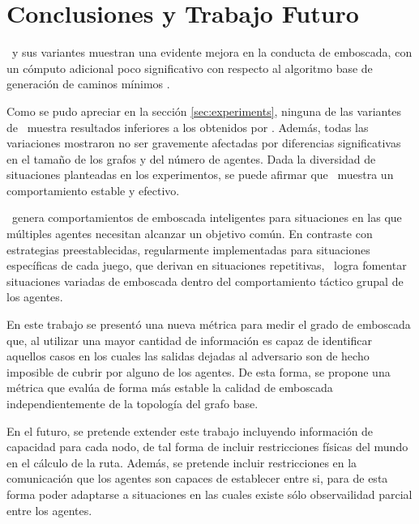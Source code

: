 \section{Conclusiones y Trabajo Futuro}
\label{sec:conclusions}

\ambush\ y sus variantes muestran una evidente mejora en la conducta de
emboscada, con un c\'omputo adicional poco significativo con respecto
al algoritmo base de generaci\'on de caminos m\'inimos \astar.

Como se pudo apreciar en la secci\'on \ref{sec:experiments}, ninguna
de las variantes de \ambush\ muestra resultados inferiores a los obtenidos
por \astar. Adem\'as, todas las variaciones mostraron no ser gravemente
afectadas por diferencias significativas en el tamaño de los grafos y
del n\'umero de agentes. Dada la diversidad de situaciones planteadas
en los experimentos, se puede afirmar que \ambush\ muestra un comportamiento
estable y efectivo.

\ambush\ genera comportamientos de emboscada inteligentes para situaciones
en las que múltiples agentes necesitan alcanzar un objetivo común. En
contraste con estrategias preestablecidas, regularmente implementadas para
situaciones específicas de cada juego, que derivan en situaciones repetitivas,
\ambush\ logra fomentar situaciones va\-ria\-das de emboscada dentro del 
comportamiento táctico grupal de los agentes.

En este trabajo se present\'o una nueva m\'etrica para medir el grado de
emboscada que, al utilizar una mayor cantidad de informaci\'on es capaz
de identificar aquellos casos en los cuales las salidas dejadas al
adversario son de hecho imposible de cubrir por alguno de los agentes.
De esta forma, se propone una m\'etrica que eval\'ua de forma m\'as
estable la calidad de emboscada independientemente de la topolog\'ia
del grafo base.

En el futuro, se pretende extender este trabajo incluyendo informaci\'on
de capacidad para cada nodo, de tal forma de incluir restricciones
f\'isicas del mundo en el c\'alculo de la ruta. Adem\'as, se pretende
incluir restricciones en la comunicaci\'on que los agentes son capaces
de establecer entre si, para de esta forma poder adaptarse a situaciones
en las cuales existe s\'olo observailidad parcial entre los agentes.

